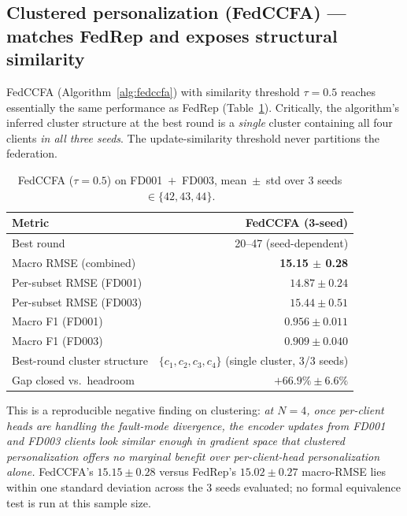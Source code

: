 \documentclass[preprint,12pt,authoryear]{elsarticle}
\begin{document}
\subsection{Clustered personalization (FedCCFA) --- matches FedRep and exposes structural similarity}
\label{sec:axis1-results-fedccfa}

FedCCFA (Algorithm~\ref{alg:fedccfa}) with similarity threshold
$\tau = 0.5$ reaches essentially the same performance as FedRep
(Table~\ref{tab:fedccfa}). Critically, the algorithm's inferred cluster
structure at the best round is a \emph{single} cluster containing all
four clients \emph{in all three seeds}. The update-similarity threshold
never partitions the federation.

\begin{table}[!ht]
\centering
\small
\caption{FedCCFA ($\tau = 0.5$) on FD001~$+$~FD003, mean~$\pm$~std over
3 seeds $\in \{42, 43, 44\}$.}
\label{tab:fedccfa}
\begin{tabular}{lr}
\toprule
Metric & FedCCFA (3-seed) \\
\midrule
Best round & 20--47 (seed-dependent) \\
Macro RMSE (combined) & \textbf{15.15 $\pm$ 0.28} \\
Per-subset RMSE (FD001) & $14.87 \pm 0.24$ \\
Per-subset RMSE (FD003) & $15.44 \pm 0.51$ \\
Macro F1 (FD001) & $0.956 \pm 0.011$ \\
Macro F1 (FD003) & $0.909 \pm 0.040$ \\
Best-round cluster structure & $\{c_1, c_2, c_3, c_4\}$ (single cluster, 3/3 seeds) \\
Gap closed vs.\ headroom & \textbf{$+66.9\% \pm 6.6\%$} \\
\bottomrule
\end{tabular}
\end{table}

This is a reproducible negative finding on clustering: \emph{at $N = 4$,
once per-client heads are handling the fault-mode divergence, the
encoder updates from FD001 and FD003 clients look similar enough in
gradient space that clustered personalization offers no marginal benefit
over per-client-head personalization alone.} FedCCFA's $15.15 \pm 0.28$
versus FedRep's $15.02 \pm 0.27$ macro-RMSE lies within one
standard deviation across the 3 seeds evaluated; no formal
equivalence test is run at this sample size.
\end{document}
